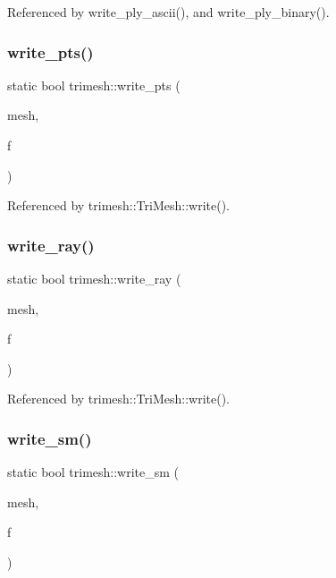 Referenced by write\+\_\+ply\+\_\+ascii(), and write\+\_\+ply\+\_\+binary().

\mbox{\label{namespacetrimesh_a12a743cd1fd6e9ed450ff82efba912bb}} 
\subsubsection{\texorpdfstring{write\+\_\+pts()}{write\_pts()}}
{\footnotesize\ttfamily static bool trimesh\+::write\+\_\+pts (\begin{DoxyParamCaption}\item[{\hyperlink{classtrimesh_1_1TriMesh}{Tri\+Mesh} $\ast$}]{mesh,  }\item[{F\+I\+LE $\ast$}]{f }\end{DoxyParamCaption})\hspace{0.3cm}{\ttfamily [static]}}



Referenced by trimesh\+::\+Tri\+Mesh\+::write().

\mbox{\label{namespacetrimesh_a4271b178e08a8202cf106be6fb327632}} 
\subsubsection{\texorpdfstring{write\+\_\+ray()}{write\_ray()}}
{\footnotesize\ttfamily static bool trimesh\+::write\+\_\+ray (\begin{DoxyParamCaption}\item[{\hyperlink{classtrimesh_1_1TriMesh}{Tri\+Mesh} $\ast$}]{mesh,  }\item[{F\+I\+LE $\ast$}]{f }\end{DoxyParamCaption})\hspace{0.3cm}{\ttfamily [static]}}



Referenced by trimesh\+::\+Tri\+Mesh\+::write().

\mbox{\label{namespacetrimesh_a1931cc0ec4adc8e542720791792a5b13}} 
\subsubsection{\texorpdfstring{write\+\_\+sm()}{write\_sm()}}
{\footnotesize\ttfamily static bool trimesh\+::write\+\_\+sm (\begin{DoxyParamCaption}\item[{\hyperlink{classtrimesh_1_1TriMesh}{Tri\+Mesh} $\ast$}]{mesh,  }\item[{F\+I\+LE $\ast$}]{f }\end{DoxyParamCaption})\hspace{0.3cm}{\ttfamily [static]}}



